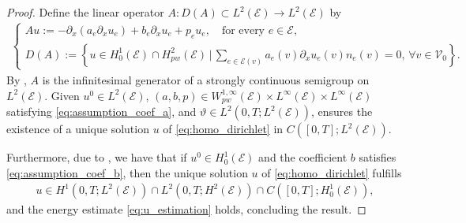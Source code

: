 \documentclass[a4paper, 10pt, english]{article}
\def\to{\rightarrow}
\begin{document}
\begin{proof}
    Define the linear operator $A: D(A) \subset L^2(\mathcal{E}) \to L^2(\mathcal{E})$ by
    \begin{align}\label{def_A_heat}
    \begin{cases} Au := - \partial_x(a_e \partial_x u_e) + b_e \partial_x u_e + p_e u_e, \quad \text{for every } e \in \mathcal{E}, \\
    D(A) := \left\{ u \in H^1_0(\mathcal{E}) \cap H_{pw}^2(\mathcal{E}) \,\Big|\, \sum_{e \in \mathcal{E}(v)} a_e(v)\partial_x u_e(v) n_e(v) = 0, \, \forall v \in \mathcal{V}_0 \right\}.
        \end{cases}
    \end{align}
    By , $A$ is the infinitesimal generator of a strongly continuous semigroup on $L^2(\mathcal{E})$. Given $u^0 \in L^2(\mathcal{E})$, $(a, b, p) \in W^{1,\infty}_{pw}(\mathcal{E}) \times L^{\infty}(\mathcal{E}) \times L^{\infty}(\mathcal{E})$ satisfying \eqref{eq:assumption_coef_a}, and $\vartheta \in L^2(0, T; L^2(\mathcal{E}))$, \cite[Proposition 3.1]{Bensoussan} ensures the existence of a unique solution $u$ of \eqref{eq:homo_dirichlet} in $C([0, T]; L^2(\mathcal{E}))$.
    
    Furthermore, due to , we have that if $u^0\in H_0^1(\mathcal{E})$ and the coefficient $b$ satisfies \eqref{eq:assumption_coef_b}, then the unique solution $u$ of \eqref{eq:homo_dirichlet} fulfills
    \begin{align*}
        u \in H^1(0, T; L^2(\mathcal{E})) \cap L^2(0, T; H^2(\mathcal{E})) \cap C([0, T]; H_0^1(\mathcal{E})),
    \end{align*}
    and the energy estimate \eqref{eq:u_estimation} holds, concluding the result.
\end{proof}
\end{document}
